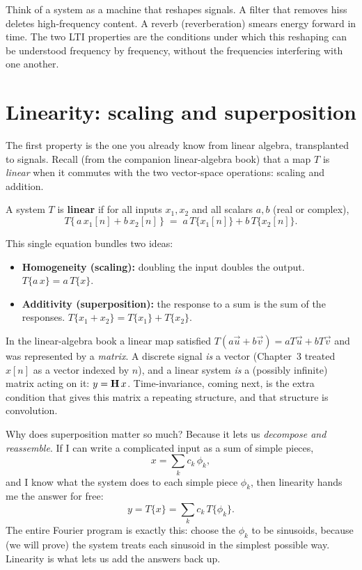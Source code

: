 \begin{intuitionbox}
Think of a system as a machine that reshapes signals. A filter that removes hiss deletes high-frequency content. A reverb (reverberation) smears energy forward in time. The two LTI properties are the conditions under which this reshaping can be understood frequency by frequency, without the frequencies interfering with one another.
\end{intuitionbox}

\section{Linearity: scaling and superposition}
\label{ch12:linearity}

The first property is the one you already know from linear algebra, transplanted
to signals. Recall (from the companion linear-algebra book) that a map $T$ is
\emph{linear} when it commutes with the two vector-space operations: scaling and
addition.

\begin{definition}[Linearity]
\label{ch12:def-linear}
A system $T$ is \textbf{linear} if for all inputs $x_1, x_2$ and all scalars
$a, b$ (real or complex),
\[
  T\{\,a\,x_1[n] + b\,x_2[n]\,\} \;=\; a\,T\{x_1[n]\} + b\,T\{x_2[n]\}.
\]
\end{definition}

This single equation bundles two ideas:
\begin{itemize}
  \item \textbf{Homogeneity (scaling):} doubling the input doubles the output.
        $T\{a\,x\} = a\,T\{x\}$.
  \item \textbf{Additivity (superposition):} the response to a sum is the sum of
        the responses. $T\{x_1 + x_2\} = T\{x_1\} + T\{x_2\}$.
\end{itemize}

\begin{connectionbox}
In the linear-algebra book a linear map satisfied $T(a\vec u + b\vec v) = a
T\vec u + b T\vec v$ and was represented by a \emph{matrix}. A discrete signal
\emph{is} a vector (Chapter~3 treated $x[n]$ as a vector indexed by $n$), and a
linear system \emph{is} a (possibly infinite) matrix acting on it:
$y = \mathbf{H}\,x$. Time-invariance, coming next, is the extra condition that
gives this matrix a repeating structure, and that structure is convolution.
\end{connectionbox}

\begin{whybox}
Why does superposition matter so much? Because it lets us \emph{decompose and
reassemble}. If I can write a complicated input as a sum of simple pieces,
\[
  x = \sum_k c_k\,\phi_k,
\]
and I know what the system does to each simple piece $\phi_k$, then linearity
hands me the answer for free:
\[
  y = T\{x\} = \sum_k c_k\,T\{\phi_k\}.
\]
The entire Fourier program is exactly this: choose the $\phi_k$ to be sinusoids,
because (we will prove) the system treats each sinusoid in the simplest
possible way. Linearity is what lets us add the answers back up.
\end{whybox}

